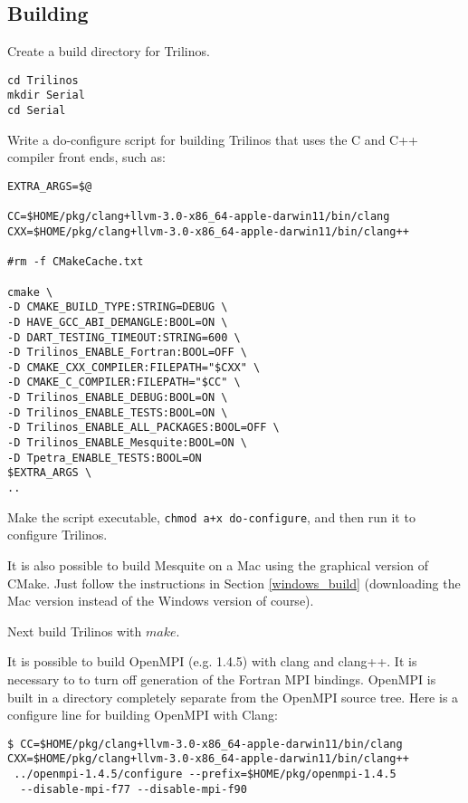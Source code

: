 \subsection{Building}
\label{building_mac}
Create a build directory for Trilinos.
\begin{verbatim}
cd Trilinos
mkdir Serial
cd Serial
\end{verbatim}
Write a do-configure script for building Trilinos that uses the C and C++ compiler front ends, such as:
\begin{verbatim}
EXTRA_ARGS=$@

CC=$HOME/pkg/clang+llvm-3.0-x86_64-apple-darwin11/bin/clang
CXX=$HOME/pkg/clang+llvm-3.0-x86_64-apple-darwin11/bin/clang++

#rm -f CMakeCache.txt

cmake \
-D CMAKE_BUILD_TYPE:STRING=DEBUG \
-D HAVE_GCC_ABI_DEMANGLE:BOOL=ON \
-D DART_TESTING_TIMEOUT:STRING=600 \
-D Trilinos_ENABLE_Fortran:BOOL=OFF \
-D CMAKE_CXX_COMPILER:FILEPATH="$CXX" \
-D CMAKE_C_COMPILER:FILEPATH="$CC" \
-D Trilinos_ENABLE_DEBUG:BOOL=ON \
-D Trilinos_ENABLE_TESTS:BOOL=ON \
-D Trilinos_ENABLE_ALL_PACKAGES:BOOL=OFF \
-D Trilinos_ENABLE_Mesquite:BOOL=ON \
-D Tpetra_ENABLE_TESTS:BOOL=ON 
$EXTRA_ARGS \
..
\end{verbatim}
Make the script executable, {\tt chmod a+x do-configure}, and then run it to configure Trilinos.

It is also possible to build Mesquite on a Mac using the graphical version of CMake. Just follow the instructions in Section \ref{windows_build} (downloading the Mac version instead of the Windows version of course).

Next build Trilinos with $make$.

It is possible to build OpenMPI (e.g. 1.4.5) with clang and clang++.  It is necessary to to turn off generation of the Fortran MPI bindings.  
OpenMPI is built in a directory completely separate from the OpenMPI source tree.
 Here is a configure line for building OpenMPI with Clang:
 \begin{verbatim}
$ CC=$HOME/pkg/clang+llvm-3.0-x86_64-apple-darwin11/bin/clang 
CXX=$HOME/pkg/clang+llvm-3.0-x86_64-apple-darwin11/bin/clang++
 ../openmpi-1.4.5/configure --prefix=$HOME/pkg/openmpi-1.4.5
  --disable-mpi-f77 --disable-mpi-f90
\end{verbatim}




